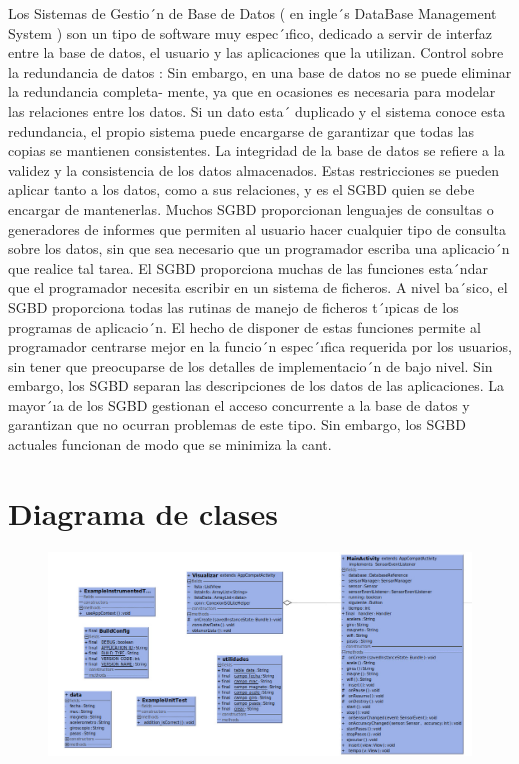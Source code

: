 \documentclass[conference,compsoc,onecolumn]{IEEEtran}
\begin{document}
Los  Sistemas  de  Gestio´n  de  Base  de  Datos  (  en  ingle´s  DataBase  Management  System  )  son  un  tipo  de  software  muy espec´ıfico, dedicado a servir de interfaz entre la base de datos, el usuario y las aplicaciones que la utilizan.
Control sobre la redundancia de datos : Sin embargo, en una base de datos no se puede eliminar la redundancia completa- mente, ya que en ocasiones es necesaria para modelar las relaciones entre los datos. Si un dato esta´ duplicado y el sistema conoce esta redundancia, el propio sistema puede encargarse de garantizar que todas las copias se mantienen consistentes.   La integridad de la base de datos se refiere a la validez y la consistencia de los datos almacenados. Estas restricciones se pueden aplicar tanto a los datos, como a sus relaciones, y es el SGBD quien se debe encargar de mantenerlas. Muchos   SGBD proporcionan lenguajes de consultas o generadores de informes que permiten al usuario hacer cualquier tipo de consulta sobre los datos, sin que sea necesario que un programador escriba una aplicacio´n que realice tal tarea. El SGBD proporciona muchas de las funciones esta´ndar que el programador necesita escribir en un sistema de ficheros. A nivel ba´sico, el SGBD proporciona todas las rutinas de manejo de ficheros t´ıpicas de los programas de aplicacio´n. El hecho de disponer de  estas  funciones  permite  al  programador  centrarse  mejor  en  la  funcio´n  espec´ıfica  requerida  por  los  usuarios,  sin  tener que preocuparse de los detalles de implementacio´n de bajo nivel. Sin embargo, los SGBD separan las descripciones de los datos de las aplicaciones. La mayor´ıa de los SGBD gestionan el acceso concurrente a la base de datos y garantizan que no ocurran problemas de este tipo. Sin embargo, los SGBD actuales funcionan de modo que se minimiza la cant.





\section{Diagrama de clases}
\label{sec:clases}

\begin{figure}[H]
    \centering
    \includegraphics[scale=0.5]{bib/2.png}
    \label{fig:1}
\end{figure}
\end{document}
